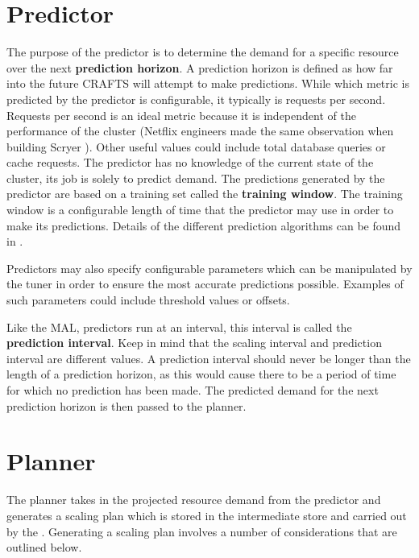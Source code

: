 \section{Predictor}
The purpose of the \textsf{predictor} is to determine the demand for a specific resource over the next \textbf{prediction horizon}. A prediction horizon is defined as how far into the future CRAFTS will attempt to make predictions. While which metric is predicted by the \textsf{predictor} is configurable, it typically is requests per second. Requests per second is an ideal metric because it is independent of the performance of the cluster (Netflix engineers made the same observation when building Scryer \cite{scryer}). Other useful values could include total database queries or cache requests. The \textsf{predictor} has no knowledge of the current state of the cluster, its job is solely to predict demand. The predictions generated by the \textsf{predictor} are based on a training set called the \textbf{training window}. The training window is a configurable length of time that the \textsf{predictor} may use in order to make its predictions. Details of the different prediction algorithms can be found in .

Predictors may also specify configurable parameters which can be manipulated by the \textsf{tuner} in order to ensure the most accurate predictions possible. Examples of such parameters could include threshold values or offsets.

Like the \textsf{MAL}, predictors run at an interval, this interval is called the \textbf{prediction interval}. Keep in mind that the scaling interval and prediction interval are different values. A prediction interval should never be longer than the length of a prediction horizon, as this would cause there to be a period of time for which no prediction has been made. The predicted demand for the next prediction horizon is then passed to the \textsf{planner}.

\section{Planner}
The \textsf{planner} takes in the projected resource demand from the \textsf{predictor} and generates a scaling plan which is stored in the intermediate store and carried out by the . Generating a scaling plan involves a number of considerations that are outlined below.

